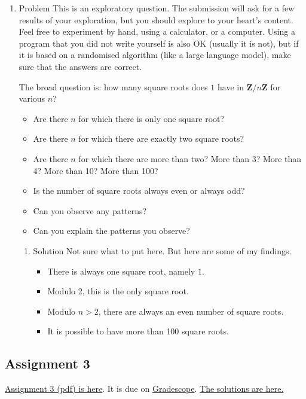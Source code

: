 \documentclass{amsart}
\begin{document}
\begin{enumerate}
\begin{enumerate}
\begin{enumerate}
The third approach is trial and error.
Trying out all 7 possibilities for \([x]\), we see that the only one that works is \([x] = [4]\).
\end{enumerate}
\item Problem
\label{sec:orgc9eca0e}
This is an exploratory question.
The submission will ask for a few results of your exploration, but you should explore to your heart's content.
Feel free to experiment by hand, using a calculator, or a computer.
Using a program that you did not write yourself is also OK (usually it is not), but if it is based on a randomised algorithm (like a large language model), make sure that the answers are correct.

The broad question is: how many square roots does \(1\) have in \(\mathbf{Z}/ n \mathbf{Z}\) for various \(n\)?
\begin{itemize}
\item Are there \(n\) for which there is only one square root?
\item Are there \(n\) for which there are exactly two square roots?
\item Are there \(n\) for which there are more than two?  More than 3? More than 4? More than 10?  More than 100?
\item Is the number of square roots always even or always odd?
\item Can you observe any patterns?
\item Can you explain the patterns you observe?
\end{itemize}
\begin{enumerate}
\item Solution
\label{sec:org092c63b}
Not sure what to put here.  But here are some of my findings.
\begin{itemize}
\item There is always one square root, namely \(1\).
\item Modulo 2, this is the only square root.
\item Modulo \(n > 2\), there are always an even number of square roots.
\item It is possible to have more than 100 square roots.
\end{itemize}
\end{enumerate}
\end{enumerate}
\end{enumerate}
\subsection{Assignment 3}
\label{sec:orgeac81ff}
\href{https://canvas.anu.edu.au/files/729999/download?download\_frd=1\&verifier=cW8gGsD5kfHF3oSH7eJqXL2vMCC3xyCR32xW89ht}{Assignment 3 (pdf) is here}.  It is due on \href{https://www.gradescope.com/courses/1070433}{Gradescope}.
\href{https://canvas.anu.edu.au/files/764458/download?download\_frd=1\&verifier=BgWBMUmAb5ztfyE5zo8uz858MeXsYyPuAMqIzidm}{The solutions are here.}
\end{document}
